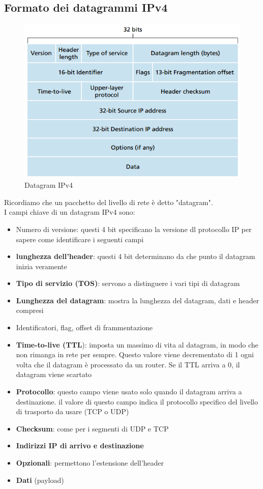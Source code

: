 \documentclass[11pt,a4paper]{book}
\begin{document}
\subsection{Formato dei datagrammi IPv4}
\begin{figure}
	\begin{center}
		\includegraphics[scale=0.6]{img/052.png}
		\caption{Datagram IPv4}
	\end{center}
\end{figure}
Ricordiamo che un pacchetto del livello di rete è detto "datagram". \\
I campi chiave di un datagram IPv4 sono:
\begin{itemize}
	\item Numero di versione: questi 4 bit specificano la versione dl protocollo IP per sapere come identificare i seguenti campi
	\item \textbf{lunghezza dell'header}: questi 4 bit determinano da che punto il datagram inizia veramente
	\item \textbf{Tipo di servizio (TOS)}: servono a distinguere i vari tipi di datagram
	\item\textbf{ Lunghezza del datagram}: mostra la lunghezza del datagram, dati e header compresi
	\item Identificatori, flag, offset di frammentazione
	\item \textbf{Time-to-live (TTL}): imposta un massimo di vita al datagram, in modo che non rimanga in rete per sempre. Questo valore viene decrementato di 1 ogni volta che il datagram è processato da un router. Se il TTL arriva a 0, il datagram viene scartato
	\item \textbf{Protocollo}: questo campo viene usato solo quando il datagram arriva a destinazione. il valore di questo campo indica il protocollo specifico del livello di trasporto da usare (TCP o UDP)
	\item \textbf{Checksum}: come per i segmenti di UDP e TCP
	\item \textbf{Indirizzi IP di arrivo e destinazione}
	\item \textbf{Opzionali}: permettono l'estensione dell'header
	\item \textbf{Dati} (payload)
\end{itemize}
\end{document}
